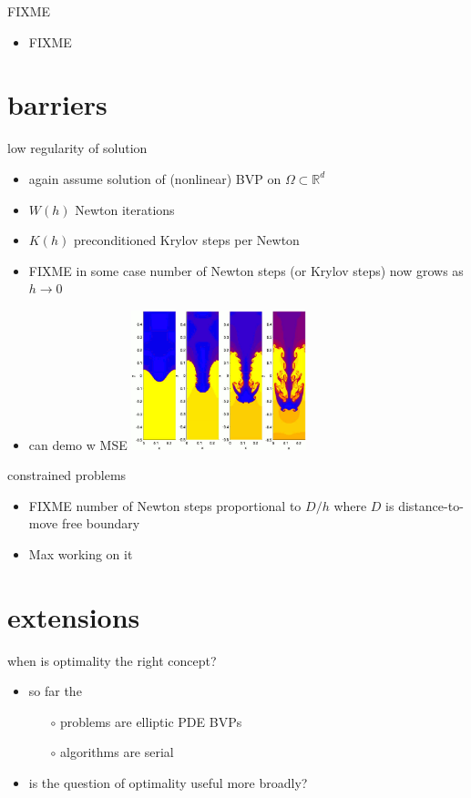 \documentclass[hide notes,intlimits,usenames,dvipsnames]{beamer}
\newcommand{\RR}{\mathbb{R}}
\begin{document}
\begin{frame}{FIXME}
\begin{itemize}
\item FIXME
\end{itemize}
\end{frame}



\section{barriers}


\begin{frame}{low regularity of solution}
\begin{itemize}
\item again assume solution of (nonlinear) BVP on $\Omega \subset \RR^d$
\item $W(h)$ Newton iterations
\item $K(h)$ preconditioned Krylov steps per Newton
\item FIXME  in some case number of Newton steps (or Krylov steps) now grows as $h\to 0$
\item can demo w MSE  \includegraphics[width=0.4\textwidth]{figs/rayleigh-taylor-instability}
\end{itemize}
\end{frame}


\begin{frame}{constrained problems}
\begin{itemize}
\item FIXME  number of Newton steps proportional to $D/h$ where $D$ is distance-to-move free boundary
\item Max working on it
\end{itemize}
\end{frame}


\section{extensions}


\begin{frame}{when is optimality the right concept?}
\begin{itemize}
\item so far the
    \begin{itemize}
    \item[$\circ$] problems are elliptic PDE BVPs
    \item[$\circ$] algorithms are serial
    \end{itemize}
\item is the question of optimality useful more broadly?
\end{itemize}
\end{frame}
\end{document}
